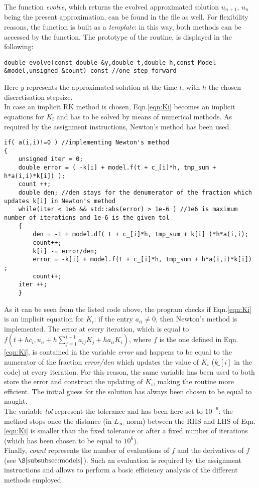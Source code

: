 \documentclass[11pt]{article}
\theoremstyle{theorem}
\theoremstyle{definition}
\begin{document}
The function \emph{evolve}, which returns the evolved approximated solution $u_{n+1}$, $u_n$ being the present approximation, can be found in the file as well. For flexibility reasons, the function is built as a \emph{template}: in this way, both methods can be accessed by the function. The prototype of the routine, is displayed in the following:

\begin{lstlisting}
double evolve(const double &y,double t,double h,const Model &model,unsigned &count) const //one step forward
\end{lstlisting}

Here $y$ represents the approximated solution at the time $t$, with $h$ the chosen discretisation stepsize.\\
In case an implicit RK method is chosen, Eqn.\ref{eqn:Ki} becomes an implicit equations for $K_i$ and has to be solved by means of numerical methods. As required by the assignment instructions, Newton's method has been used.\\

\begin{lstlisting}
if( a(i,i)!=0 ) //implementing Newton's method
{
	unsigned iter = 0;
	double error = ( -k[i] + model.f(t + c_[i]*h, tmp_sum + h*a(i,i)*k[i]) );
	count ++;
	double den; //den stays for the denumerator of the fraction which updates k[i] in Newton's method
	while(iter < 1e6 && std::abs(error) > 1e-6 ) //1e6 is maximum number of iterations and 1e-6 is the given tol
	{
		den = -1 + model.df( t + c_[i]*h, tmp_sum + k[i] )*h*a(i,i);
		count++;
		k[i] -= error/den;
		error = -k[i] + model.f(t + c_[i]*h, tmp_sum + h*a(i,i)*k[i]) ;
		count++;
	iter ++;
	}
\end{lstlisting}

As it can be seen from the listed code above, the program checks if Eqn.\eqref{eqn:Ki} is an implicit equation for $K_i$: if the entry $a_{ii}\neq 0$, then Newton's method is implemented. The error at every iteration, which is equal to $f\left(t+hc_i, u_n+h\sum_{j=1}^{i-1}a_{ij}K_j+ha_{ii}K_i\right)$, where $f$ is the one defined in Eqn.\eqref{eqn:Ki}, is contained in the variable \emph{error} and happens to be equal to the numerator of the fraction \emph{error/den} which updates the value of $K_i$ (\emph{k$\_[i]$} in the code) at every iteration. For this reason, the same variable has been used to both store the error and construct the updating of $K_i$, making the routine more efficient. The initial guess for the solution has always been chosen to be equal to naught.\\
The variable \emph{tol} represent the tolerance and has been here set to $10^{-6}$: the method stops once the distance (in $L_\infty$ norm) between the RHS and LHS of Eqn.\eqref{eqn:Ki} is smaller than the fixed tolerance or after a fixed number of iterations (which has been chosen to be equal to $10^6$).\\
Finally, \emph{count} represents the number of evaluations of $f$ and the derivatives of $f$ (see $\S\ref{subsubsec:models}$). Such an evaluation is required by the assignment instructions and allows to perform a basic efficiency analysis of the different methods employed.\\ 
\end{document}
